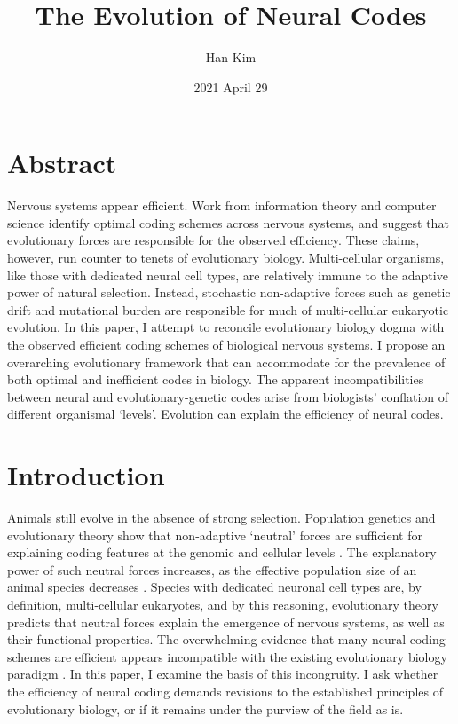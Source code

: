 \documentclass{article}
\begin{document}
\title{The Evolution of Neural Codes}
\author{Han Kim }
\date{2021 April 29}

\maketitle

\section*{Abstract}

Nervous systems appear efficient. Work from information theory and computer science identify optimal coding schemes across nervous systems, and suggest that evolutionary forces are responsible for the observed efficiency. These claims, however, run counter to tenets of evolutionary biology. Multi-cellular organisms, like those with dedicated neural cell types, are relatively immune to the adaptive power of natural selection. Instead, stochastic non-adaptive forces such as genetic drift and mutational burden are responsible for much of multi-cellular eukaryotic evolution. In this paper, I attempt to reconcile evolutionary biology dogma with the observed efficient coding schemes of biological nervous systems. I propose an overarching evolutionary framework that can accommodate for the prevalence of both optimal and inefficient codes in biology. The apparent incompatibilities between neural and evolutionary-genetic codes arise from biologists' conflation of different organismal `levels'. Evolution can explain the efficiency of neural codes. 

\section{Introduction}

Animals still evolve in the absence of strong selection. Population genetics and evolutionary theory show that non-adaptive `neutral' forces are sufficient for explaining coding features at the genomic and cellular levels \cite{Lynch_2007, lynch2007origins}. The explanatory power of such neutral forces increases, as the effective population size of an animal species decreases \cite{Lynch_Conery_2003, kimura1983neutral}. Species with dedicated neuronal cell types are, by definition, multi-cellular eukaryotes, and by this reasoning, evolutionary theory predicts that neutral forces explain the emergence of nervous systems, as well as their functional properties. The overwhelming evidence that many neural coding schemes are efficient appears incompatible with the existing evolutionary biology paradigm \cite{Barlow_2012, Pitkow_Meister_2012, Machens_Gollisch_Kolesnikova_Herz_2005, Mimica_Dunn_Tombaz_Bojja_Whitlock_2018}. In this paper, I examine the basis of this incongruity. I ask whether the efficiency of neural coding demands revisions to the established principles of evolutionary biology, or if it remains under the purview of the field as is.
\end{document}
